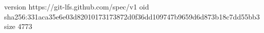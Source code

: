 version https://git-lfs.github.com/spec/v1
oid sha256:331aca35e6e03d82010173173872d0f36dd109747b9659d6d873b18c7dd55bb3
size 4773
